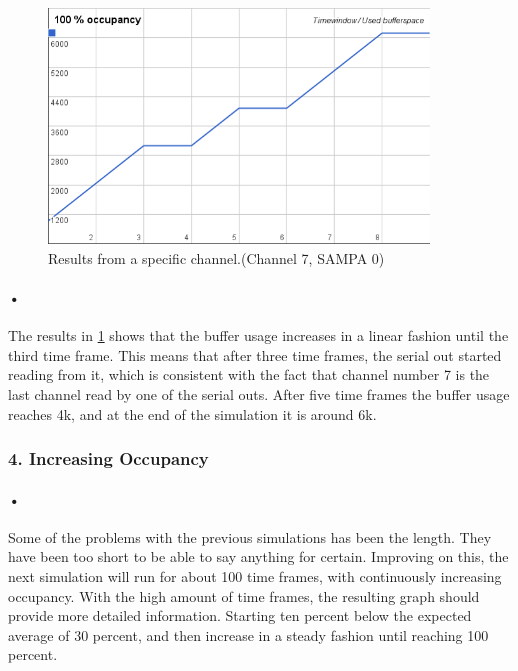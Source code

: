 \documentclass[a4paper, 12pt, openright, twoside]{report}
\begin{document}
\begin{figure}[h!]
	\centering
		\includegraphics[width=0.9\textwidth]{images/flat-100.png}
		\caption{Results from a specific channel.(Channel 7, SAMPA 0)}
		\label{fig:flat-100}
\end{figure}

\paragraph{•} %
The results in \ref{fig:flat-100} shows that the buffer usage increases in a linear fashion until the third time frame.
This means that after three time frames, the serial out started reading from it, which is consistent with the fact that channel number 7 is the last channel read by one of the serial outs.
After five time frames the buffer usage reaches 4k, and at the end of the simulation it is around 6k.

\subsubsection{4. Increasing Occupancy}

\paragraph{•} %
Some of the problems with the previous simulations has been the length.
They have been too short to be able to say anything for certain.
Improving on this, the next simulation will run for about 100 time frames, with continuously increasing occupancy.
With the high amount of time frames, the resulting graph should provide more detailed information.
Starting ten percent below the expected average of 30 percent, and then increase in a steady fashion until reaching 100 percent.
\end{document}
